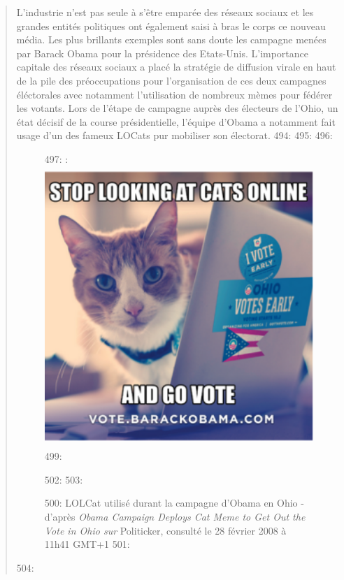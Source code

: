 \begin{quote}
\begin{description}
L{\textquoteright}industrie n{\textquoteright}est pas seule \`a s{\textquoteright}\^etre empar\'ee des r\'eseaux sociaux et les grandes entit\'es politiques ont \'egalement saisi \`a bras le corps ce nouveau m\'edia. Les plus brillants exemples sont sans doute les campagne men\'ees par Barack Obama pour la pr\'esidence des Etats-Unis. L{\textquoteright}importance capitale des r\'eseaux sociaux a plac\'e la strat\'egie de diffusion virale en haut de la pile des pr\'eoccupations pour l{\textquoteright}organisation de ces deux campagnes \'el\'ectorales \cite{Miller2008} avec notamment l{\textquoteright}utilisation de nombreux m\`emes pour f\'ed\'erer les votants. Lors de l{\textquoteright}\'etape de campagne aupr\`es des \'electeurs de l{\textquoteright}Ohio, un \'etat d\'ecisif de la course pr\'esidentielle, l{\textquoteright}\'equipe d{\textquoteright}Obama a notamment fait usage d{\textquoteright}un des fameux LOCats pur mobiliser son \'electorat. 
494: 
495: 
496: \begin{figure}
497:     :     \includegraphics[width=4.1669in,height=4.178in]{figures/chap2/chapitre2-img16.png}
499:     \caption[Lolcat utilisé lors la campagne d'Obama]{ 
500:         LOLCat utilis\'e durant la campagne d{\textquoteright}Obama en Ohio - d{\textquoteright}apr\`es \textit{Obama Campaign Deploys Cat Meme to Get Out the Vote in Ohio sur }Politicker, consult\'e le 28 f\'evrier 2008 \`a 11h41 GMT+1
501:     } 
502:     \label{fig:obama-cat}
503: \end{figure}
504: 

\end{description}
\end{quote}
